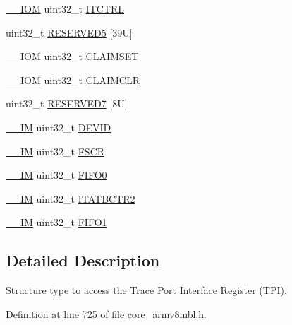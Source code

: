 \begin{DoxyCompactItemize}
\hyperlink{core__sc300_8h_ab6caba5853a60a17e8e04499b52bf691}{\+\_\+\+\_\+\+I\+OM} uint32\+\_\+t \hyperlink{struct_t_p_i___type_aaa4c823c10f115f7517c82ef86a5a68d}{I\+T\+C\+T\+RL}
\item 
uint32\+\_\+t \hyperlink{struct_t_p_i___type_a9c1ac143e09b64b1f6eb92ecd65d60d0}{R\+E\+S\+E\+R\+V\+E\+D5} \mbox{[}39\+U\mbox{]}
\item 
\hyperlink{core__sc300_8h_ab6caba5853a60a17e8e04499b52bf691}{\+\_\+\+\_\+\+I\+OM} uint32\+\_\+t \hyperlink{struct_t_p_i___type_af8b7d15fa5252b733dd4b11fa1b5730a}{C\+L\+A\+I\+M\+S\+ET}
\item 
\hyperlink{core__sc300_8h_ab6caba5853a60a17e8e04499b52bf691}{\+\_\+\+\_\+\+I\+OM} uint32\+\_\+t \hyperlink{struct_t_p_i___type_a0e10e292cb019a832b03ddd055b2f6ac}{C\+L\+A\+I\+M\+C\+LR}
\item 
uint32\+\_\+t \hyperlink{struct_t_p_i___type_a33bb14730a444fdeeb91ea9cb7218e62}{R\+E\+S\+E\+R\+V\+E\+D7} \mbox{[}8\+U\mbox{]}
\item 
\hyperlink{core__sc300_8h_a4cc1649793116d7c2d8afce7a4ffce43}{\+\_\+\+\_\+\+IM} uint32\+\_\+t \hyperlink{struct_t_p_i___type_abc0ecda8a5446bc754080276bad77514}{D\+E\+V\+ID}
\item 
\hyperlink{core__sc300_8h_a4cc1649793116d7c2d8afce7a4ffce43}{\+\_\+\+\_\+\+IM} uint32\+\_\+t \hyperlink{struct_t_p_i___type_ad6901bfd8a0089ca7e8a20475cf494a8}{F\+S\+CR}
\item 
\hyperlink{core__sc300_8h_a4cc1649793116d7c2d8afce7a4ffce43}{\+\_\+\+\_\+\+IM} uint32\+\_\+t \hyperlink{struct_t_p_i___type_aa4d7b5cf39dff9f53bf7f69bc287a814}{F\+I\+F\+O0}
\item 
\hyperlink{core__sc300_8h_a4cc1649793116d7c2d8afce7a4ffce43}{\+\_\+\+\_\+\+IM} uint32\+\_\+t \hyperlink{struct_t_p_i___type_ab358319b969d3fed0f89bbe33e9f1652}{I\+T\+A\+T\+B\+C\+T\+R2}
\item 
\hyperlink{core__sc300_8h_a4cc1649793116d7c2d8afce7a4ffce43}{\+\_\+\+\_\+\+IM} uint32\+\_\+t \hyperlink{struct_t_p_i___type_a061372fcd72f1eea871e2d9c1be849bc}{F\+I\+F\+O1}
\end{DoxyCompactItemize}


\subsection{Detailed Description}
Structure type to access the Trace Port Interface Register (T\+PI). 

Definition at line 725 of file core\+\_\+armv8mbl.\+h.



